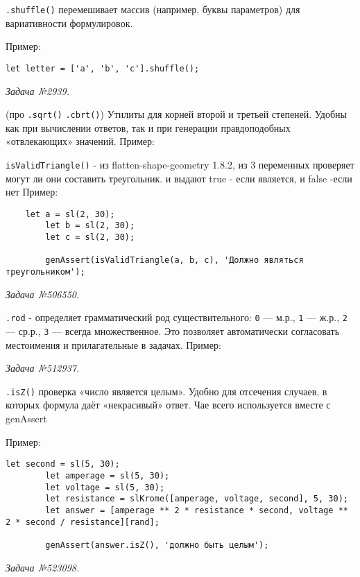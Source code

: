  \texttt{.shuffle()} перемешивает массив (например, буквы параметров) для вариативности формулировок.

Пример:
\begin{lstlisting}
let letter = ['a', 'b', 'c'].shuffle();
\end{lstlisting}
\textsl{Задача №2939.}
 

(про \texttt{.sqrt()} \texttt{.cbrt()})
Утилиты для корней второй и третьей степеней. Удобны как при вычислении ответов, так и при генерации правдоподобных «отвлекающих» значений.
Пример:
 


\texttt{isValidTriangle()} - из  flatten-shape-geometry 1.8.2, из 3 переменных проверяет могут ли они составить треугольник. и выдают true - если является, и false -если нет
Пример:
\begin{lstlisting}
	let a = sl(2, 30);
		let b = sl(2, 30);
		let c = sl(2, 30);

		genAssert(isValidTriangle(a, b, c), 'Должно являться треугольником');
\end{lstlisting}
\textsl{Задача №506550.}

\texttt{.rod} - определяет грамматический род существительного: \verb|0| — м.р., \verb|1| — ж.р., \verb|2| — ср.р., \verb|3| — всегда множественное. 
Это позволяет автоматически согласовать местоимения и прилагательные в задачах.
Пример:
 
\textsl{Задача №512937.}

\texttt{.isZ()} проверка «число является целым». Удобно для отсечения случаев, в которых формула даёт «некрасивый» ответ. Чае всего используется вместе с genAssert   

Пример:
\begin{lstlisting}
let second = sl(5, 30);
		let amperage = sl(5, 30);
		let voltage = sl(5, 30);
		let resistance = slKrome([amperage, voltage, second], 5, 30);
		let answer = [amperage ** 2 * resistance * second, voltage ** 2 * second / resistance][rand];

		genAssert(answer.isZ(), 'должно быть целым');
\end{lstlisting}
\textsl{Задача №523098.}



